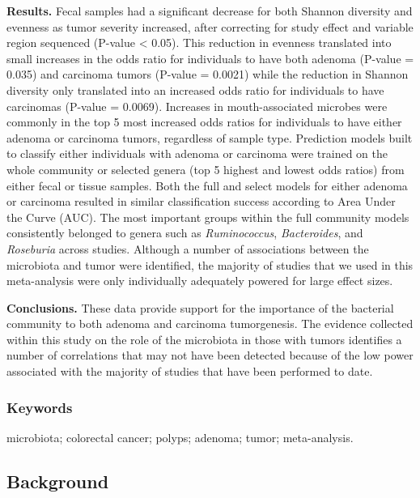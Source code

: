 \documentclass[12pt,]{article}
\begin{document}
\textbf{Results.} Fecal samples had a significant decrease for both
Shannon diversity and evenness as tumor severity increased, after
correcting for study effect and variable region sequenced (P-value
\textless{} 0.05). This reduction in evenness translated into small
increases in the odds ratio for individuals to have both adenoma
(P-value = 0.035) and carcinoma tumors (P-value = 0.0021) while the
reduction in Shannon diversity only translated into an increased odds
ratio for individuals to have carcinomas (P-value = 0.0069). Increases
in mouth-associated microbes were commonly in the top 5 most increased
odds ratios for individuals to have either adenoma or carcinoma tumors,
regardless of sample type. Prediction models built to classify either
individuals with adenoma or carcinoma were trained on the whole
community or selected genera (top 5 highest and lowest odds ratios) from
either fecal or tissue samples. Both the full and select models for
either adenoma or carcinoma resulted in similar classification success
according to Area Under the Curve (AUC). The most important groups
within the full community models consistently belonged to genera such as
\emph{Ruminococcus}, \emph{Bacteroides}, and \emph{Roseburia} across
studies. Although a number of associations between the microbiota and
tumor were identified, the majority of studies that we used in this
meta-analysis were only individually adequately powered for large effect
sizes.

\textbf{Conclusions.} These data provide support for the importance of
the bacterial community to both adenoma and carcinoma tumorgenesis. The
evidence collected within this study on the role of the microbiota in
those with tumors identifies a number of correlations that may not have
been detected because of the low power associated with the majority of
studies that have been performed to date.

\subsubsection{Keywords}\label{keywords}

microbiota; colorectal cancer; polyps; adenoma; tumor; meta-analysis.

\newpage

\subsection{Background}\label{background}
\end{document}
